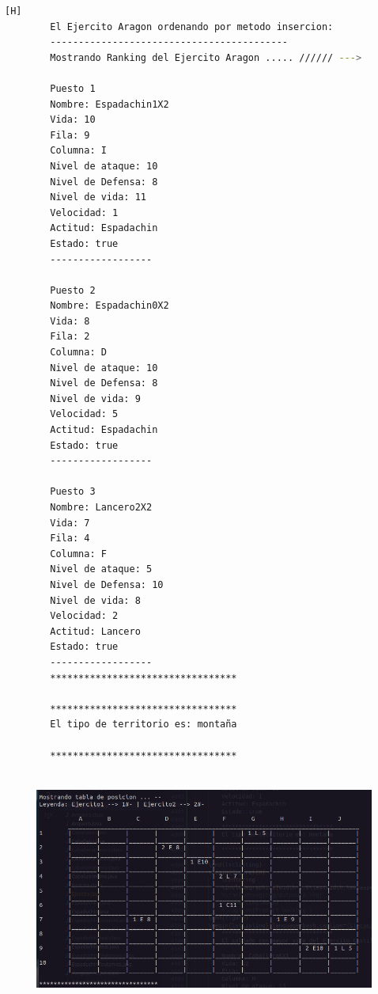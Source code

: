 \documentclass{article}
\begin{document}
\begin{lstlisting}[language=bash,caption={Ejecucion:}][H]
		El Ejercito Aragon ordenando por metodo insercion: 
		------------------------------------------
		Mostrando Ranking del Ejercito Aragon ..... ////// --->
		
		Puesto 1
		Nombre: Espadachin1X2
		Vida: 10
		Fila: 9
		Columna: I
		Nivel de ataque: 10
		Nivel de Defensa: 8
		Nivel de vida: 11
		Velocidad: 1
		Actitud: Espadachin
		Estado: true
		------------------
		
		Puesto 2
		Nombre: Espadachin0X2
		Vida: 8
		Fila: 2
		Columna: D
		Nivel de ataque: 10
		Nivel de Defensa: 8
		Nivel de vida: 9
		Velocidad: 5
		Actitud: Espadachin
		Estado: true
		------------------
		
		Puesto 3
		Nombre: Lancero2X2
		Vida: 7
		Fila: 4
		Columna: F
		Nivel de ataque: 5
		Nivel de Defensa: 10
		Nivel de vida: 8
		Velocidad: 2
		Actitud: Lancero
		Estado: true
		------------------
		*********************************
		
		*********************************
		El tipo de territorio es: montaña
		
		*********************************
		
	\end{lstlisting}
	\begin{figure}[H]
		\centering
		\includegraphics[width=1.0\textwidth,keepaspectratio]{img/Commit12-5.png}
	\end{figure}
\end{document}
